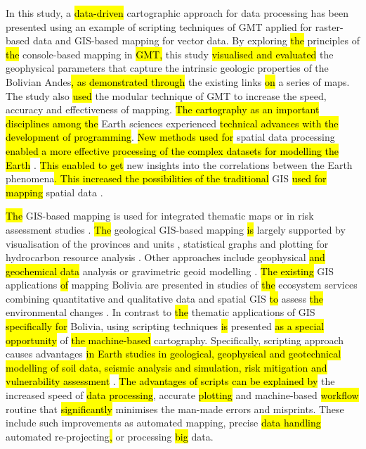 \documentclass[data,article,submit,pdftex,moreauthors]{Definitions/mdpi}
\begin{document}
In this study, a \hl{data-driven} cartographic approach for data processing has been presented using an example of scripting techniques of GMT applied for raster-based data and \hl{ }GIS-based mapping for vector data. By exploring \hl{the} principles of \hl{the} console-based mapping in \hl{GMT, }this study \hl{visualised and evaluated} the geophysical parameters that capture the intrinsic geologic properties of the Bolivian Andes\hl{, as demonstrated through} the existing links \hl{on} a series of maps. The study also \hl{used} the modular technique of GMT to increase the speed, accuracy and effectiveness of mapping. \hl{The cartography as an important disciplines among the} Earth sciences experienced \hl{technical advances with the development of programming}. \hl{New methods used for}  spatial data processing\hl{ enabled a more effective processing of the complex datasets for modelling the Earth} \cite{Bar,LOMBARDO,Lemenkova2020e}. \hl{This enabled to get} new insights into the correlations between the Earth phenomena\hl{. This increased the possibilities of the traditional }GIS \hl{used for mapping} spatial data \cite{Millington,Lemenkova202137}. 	

\hl{The} GIS-based mapping is used for integrated thematic maps\hl{ }or in risk assessment studies \cite{Vella,Lemenkova202120}. \hl{The }geological GIS-based mapping \hl{is} largely supported by visualisation of the provinces and units \cite{Nedel}, statistical graphs and plotting for hydrocarbon resource analysis \cite{Jemio}. Other approaches include geophysical \hl{and geochemical data} analysis \cite{Collinson,Lindh2022,Ocola} or gravimetric geoid modelling \cite{Corchete}. \hl{The existing} GIS applications \hl{of} mapping Bolivia are presented in studies of \hl{the} ecosystem services combining quantitative and qualitative data and spatial GIS \hl{to} assess \hl{the} environmental changes \cite{Hinojosa}. In contrast to \hl{the} thematic applications of GIS \hl{specifically for} Bolivia, using scripting techniques \hl{is} presented \hl{as a special opportunity} of \hl{the machine-based} cartography. Specifically, scripting approach causes advantages \hl{in Earth studies in geological, geophysical and geotechnical modelling of soil data, seismic analysis and simulation, risk mitigation and vulnerability assessment} \cite{Falcone,Lindh2021b,Chang,Fayjaloun,Petersen}. \hl{The advantages of scripts can be explained by} the increased speed of \hl{data processing}, accurate \hl{plotting} and machine-based \hl{workflow} routine that \hl{significantly} minimises the man-made errors and misprints. These include such improvements as automated mapping, precise \hl{data handling} automated re-projecting\hl{, }or processing \hl{big} data.
\end{document}
